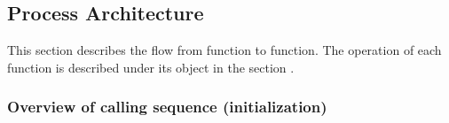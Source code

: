 
%
%
% 
%


\subsection{Process Architecture}
This section describes the flow from function to function.  The
operation of each function is described under its object in the section
.


\subsubsection{Overview of calling sequence (initialization)}

